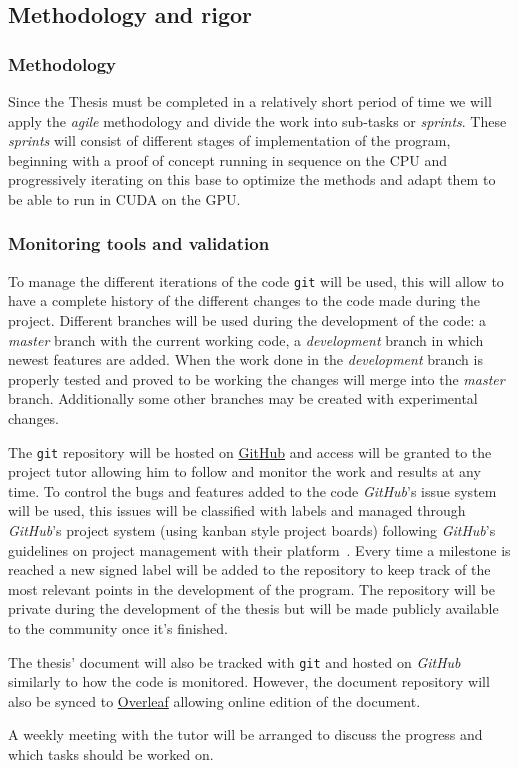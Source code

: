 \pagebreak
\subsection{Methodology and rigor}

\subsubsection{Methodology}

Since the Thesis must be completed in a relatively short period of time we will
apply the \emph{agile} methodology and divide the work into sub-tasks or
\emph{sprints}. These \emph{sprints} will consist of different stages of
implementation of the program, beginning with a proof of concept running in
sequence on the CPU and progressively iterating on this base to optimize the
methods and adapt them to be able to run in CUDA on the GPU.

\subsubsection{Monitoring tools and validation}

To manage the different iterations of the code \texttt{git} will be used,
this will allow to have a complete history of the different changes to the code
made during the project. Different branches will be used during the development
of the code: a \emph{master} branch with the current working code, a
\emph{development} branch in which newest features are added. When the work done
in the \emph{development} branch is properly tested and proved to be working the
changes will merge into the \emph{master} branch. Additionally some
other branches may be created with experimental changes.

The \texttt{git} repository will be hosted on \href{github.com}{GitHub} and
access will be granted to the project tutor allowing him to follow and monitor
the work and results at any time. To control the bugs and features added to the
code \emph{GitHub}'s issue system will be used, this issues will be classified
with labels and managed through \emph{GitHub}'s project system (using kanban style
project boards) following \emph{GitHub}'s guidelines on project management with
their platform~\cite{github_managing_2021}.  Every time a milestone is reached a
new signed label will be added to the repository to keep track of the most
relevant points in the development of the program. The repository will be
private during the development of the thesis but will be made publicly available
to the community once it's finished.

The thesis' document will also be tracked with \texttt{git} and hosted on
\emph{GitHub} similarly to how the code is monitored. However, the document
repository will also be synced to \href{overleaf.com}{Overleaf} allowing online
edition of the document.

A weekly meeting with the tutor will be arranged to discuss the progress and
which tasks should be worked on.